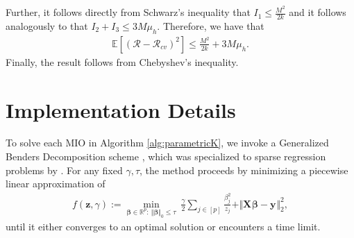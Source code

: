 \documentclass[mnsc,nonblindrev]{informs3} %
\begin{document}
Further, it follows directly from Schwarz's inequality \citep[see also][pp. 522]{bousquet2002stability} that $I_1 \leq \frac{M^2}{2k}$ and it follows analogously to \citep[pp. 522]{bousquet2002stability} that $I_2+I_3 \leq 3 M \mu_h$. Therefore, we have that
\begin{align*}
    \mathbb{E}[(\mathcal{R}-\mathcal{R}_{cv})^2] \leq \frac{M^2}{2k}+3 M \mu_h.
\end{align*}
Finally, the result follows from Chebyshev's inequality. 
\Halmos 
\endproof


\section{Implementation Details}\label{sec:append.implementationdetails}
To solve each MIO in Algorithm \ref{alg:parametricK}, we invoke a Generalized Benders Decomposition scheme \citep{geoffrion1972generalized}, which was specialized to sparse regression problems by \cite{bertsimas2020sparse}. For any fixed $\gamma, \tau$, the method proceeds by minimizing a piecewise linear approximation of 
\begin{align}
    f(\bm{z}, \gamma):=\min_{\bm{\beta} \in \mathbb{R}^p: \ \Vert \bm{\beta}\Vert_0 \leq \tau} \ \frac{\gamma}{2}\sum_{j \in [p]}\frac{\beta_j^2}{z_j}+\Vert \bm{X}^{}\bm{\beta}-\bm{y}^{}\Vert_2^2,\label{prob:persp1}
\end{align}
until it either converges to an optimal solution or encounters a time limit. %
\end{document}
